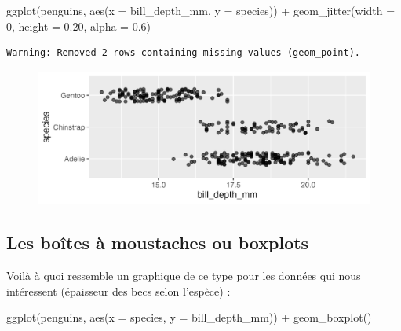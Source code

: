 \documentclass[
  letterpaper,
  DIV=11,
  numbers=noendperiod]{scrreprt}
\newenvironment{Shaded}{\begin{snugshade}}{\end{snugshade}}
\newcommand{\AttributeTok}[1]{\textcolor[rgb]{0.40,0.45,0.13}{#1}}
\newcommand{\DecValTok}[1]{\textcolor[rgb]{0.68,0.00,0.00}{#1}}
\newcommand{\FloatTok}[1]{\textcolor[rgb]{0.68,0.00,0.00}{#1}}
\newcommand{\FunctionTok}[1]{\textcolor[rgb]{0.28,0.35,0.67}{#1}}
\newcommand{\NormalTok}[1]{\textcolor[rgb]{0.00,0.23,0.31}{#1}}
\newcommand{\SpecialCharTok}[1]{\textcolor[rgb]{0.37,0.37,0.37}{#1}}
\begin{document}
\begin{Shaded}
\begin{Highlighting}[]
\FunctionTok{ggplot}\NormalTok{(penguins, }\FunctionTok{aes}\NormalTok{(}\AttributeTok{x =}\NormalTok{ bill\_depth\_mm, }\AttributeTok{y =}\NormalTok{ species)) }\SpecialCharTok{+}
  \FunctionTok{geom\_jitter}\NormalTok{(}\AttributeTok{width =} \DecValTok{0}\NormalTok{, }\AttributeTok{height =} \FloatTok{0.20}\NormalTok{, }\AttributeTok{alpha =} \FloatTok{0.6}\NormalTok{)}
\end{Highlighting}
\end{Shaded}

\begin{verbatim}
Warning: Removed 2 rows containing missing values (geom_point).
\end{verbatim}

\begin{figure}[H]

{\centering \includegraphics{./03-visualization_files/figure-pdf/unnamed-chunk-71-1.png}

}

\end{figure}

\hypertarget{les-bouxeetes-uxe0-moustaches-ou-boxplots}{%
\subsection{Les boîtes à moustaches ou
boxplots}\label{les-bouxeetes-uxe0-moustaches-ou-boxplots}}

Voilà à quoi ressemble un graphique de ce type pour les données qui nous
intéressent (épaisseur des becs selon l'espèce) :

\begin{Shaded}
\begin{Highlighting}[]
\FunctionTok{ggplot}\NormalTok{(penguins, }\FunctionTok{aes}\NormalTok{(}\AttributeTok{x =}\NormalTok{ species, }\AttributeTok{y =}\NormalTok{ bill\_depth\_mm)) }\SpecialCharTok{+}
  \FunctionTok{geom\_boxplot}\NormalTok{()}
\end{Highlighting}
\end{Shaded}
\end{document}
